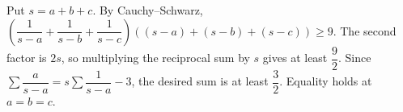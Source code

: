 Put $s=a+b+c$. By Cauchy--Schwarz, $\left(\dfrac{1}{s-a}+\dfrac{1}{s-b}+\dfrac{1}{s-c}\right)((s-a)+(s-b)+(s-c))\ge9$. The second factor is $2s$, so multiplying the reciprocal sum by $s$ gives at least $\dfrac{9}{2}$. Since $\sum\dfrac{a}{s-a}=s\sum\dfrac{1}{s-a}-3$, the desired sum is at least $\dfrac{3}{2}$. Equality holds at $a=b=c$.
